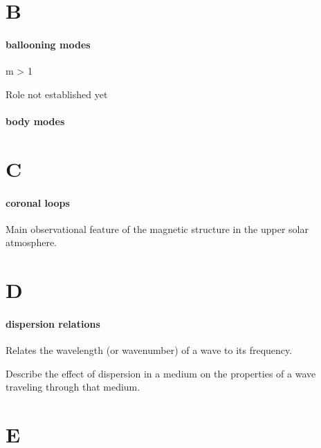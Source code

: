 \documentclass[12pt]{article}
\begin{document}
\section*{B}

\paragraph{ballooning modes}
\begin{itemize*}
    \item m > 1
    \item Role not established yet
\end{itemize*}

\paragraph{body modes}

\section*{C}

\paragraph{coronal loops}
\begin{itemize*}
    \item Main observational feature of the magnetic structure in the
        upper solar atmosphere.
\end{itemize*}

\section*{D}

\paragraph{dispersion relations}
\begin{itemize*}
    \item Relates the wavelength (or wavenumber) of a wave to its
        frequency.
    \item Describe the effect of dispersion in a medium on the properties
        of a wave traveling through that medium.
\end{itemize*}

\section*{E}
\end{document}

